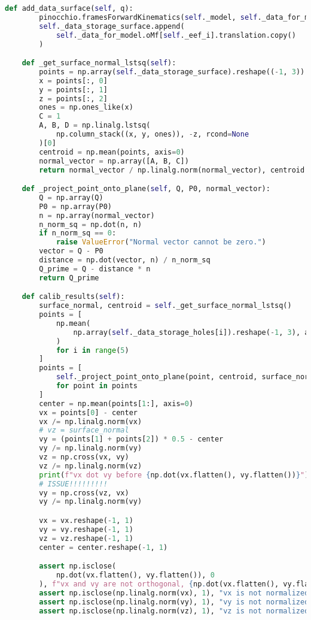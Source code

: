 \begin{lstlisting}[language=python, caption=\raggedright{calibration/sensor\_calibration.py}, frame=single]
    def add_data_surface(self, q):
        pinocchio.framesForwardKinematics(self._model, self._data_for_model, q)
        self._data_storage_surface.append(
            self._data_for_model.oMf[self._eef_i].translation.copy()
        )

    def _get_surface_normal_lstsq(self):
        points = np.array(self._data_storage_surface).reshape((-1, 3))
        x = points[:, 0]
        y = points[:, 1]
        z = points[:, 2]
        ones = np.ones_like(x)
        C = 1
        A, B, D = np.linalg.lstsq(
            np.column_stack((x, y, ones)), -z, rcond=None
        )[0]
        centroid = np.mean(points, axis=0)
        normal_vector = np.array([A, B, C])
        return normal_vector / np.linalg.norm(normal_vector), centroid

    def _project_point_onto_plane(self, Q, P0, normal_vector):
        Q = np.array(Q)
        P0 = np.array(P0)
        n = np.array(normal_vector)
        n_norm_sq = np.dot(n, n)
        if n_norm_sq == 0:
            raise ValueError("Normal vector cannot be zero.")
        vector = Q - P0
        distance = np.dot(vector, n) / n_norm_sq
        Q_prime = Q - distance * n
        return Q_prime

    def calib_results(self):
        surface_normal, centroid = self._get_surface_normal_lstsq()
        points = [
            np.mean(
                np.array(self._data_storage_holes[i]).reshape(-1, 3), axis=0
            )
            for i in range(5)
        ]
        points = [
            self._project_point_onto_plane(point, centroid, surface_normal)
            for point in points
        ]
        center = np.mean(points[1:], axis=0)
        vx = points[0] - center
        vx /= np.linalg.norm(vx)
        # vz = surface_normal
        vy = (points[1] + points[2]) * 0.5 - center
        vy /= np.linalg.norm(vy)
        vz = np.cross(vx, vy)
        vz /= np.linalg.norm(vz)
        print(f"vx dot vy before {np.dot(vx.flatten(), vy.flatten())}")
        # ISSUE!!!!!!!!!
        vy = np.cross(vz, vx)
        vy /= np.linalg.norm(vy)

        vx = vx.reshape(-1, 1)
        vy = vy.reshape(-1, 1)
        vz = vz.reshape(-1, 1)
        center = center.reshape(-1, 1)

        assert np.isclose(
            np.dot(vx.flatten(), vy.flatten()), 0
        ), f"vx and vy are not orthogonal, {np.dot(vx.flatten(), vy.flatten()) = }"
        assert np.isclose(np.linalg.norm(vx), 1), "vx is not normalized"
        assert np.isclose(np.linalg.norm(vy), 1), "vy is not normalized"
        assert np.isclose(np.linalg.norm(vz), 1), "vz is not normalized"


\end{lstlisting}
